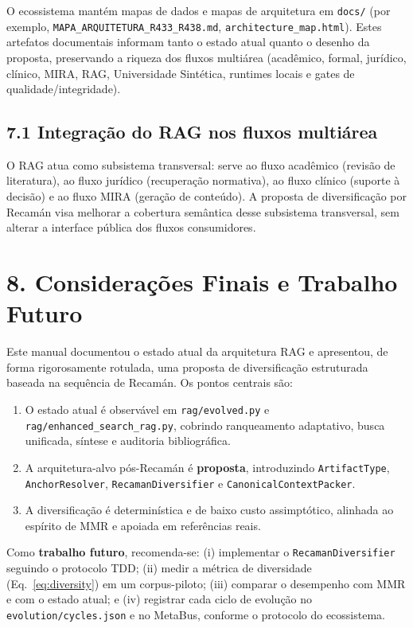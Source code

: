 \documentclass[
	article,
	11pt,
	oneside,
	a4paper,
	english,
	brazil,
	sumario=tradicional
	]{abntex2}
\begin{document}
O ecossistema mantém mapas de dados e mapas de arquitetura em
\texttt{docs/} (por exemplo, \texttt{MAPA\_ARQUITETURA\_R433\_R438.md},
\texttt{architecture\_map.html}). Estes artefatos documentais informam tanto o
estado atual quanto o desenho da proposta, preservando a riqueza dos fluxos
multiárea (acadêmico, formal, jurídico, clínico, MIRA, RAG, Universidade
Sintética, runtimes locais e gates de qualidade/integridade).

\subsection*{7.1 Integração do RAG nos fluxos multiárea}

O RAG atua como subsistema transversal: serve ao fluxo acadêmico (revisão de
literatura), ao fluxo jurídico (recuperação normativa), ao fluxo clínico
(suporte à decisão) e ao fluxo MIRA (geração de conteúdo). A proposta de
diversificação por Recamán visa melhorar a cobertura semântica desse subsistema
transversal, sem alterar a interface pública dos fluxos consumidores.

\section*{8. Considerações Finais e Trabalho Futuro}

Este manual documentou o estado atual da arquitetura RAG e apresentou, de forma
rigorosamente rotulada, uma proposta de diversificação estruturada baseada na
sequência de Recamán. Os pontos centrais são:

\begin{enumerate}[label=\arabic*.]
  \item O estado atual é observável em \texttt{rag/evolved.py} e
        \texttt{rag/enhanced\_search\_rag.py}, cobrindo ranqueamento adaptativo,
        busca unificada, síntese e auditoria bibliográfica.
  \item A arquitetura-alvo pós-Recamán é \textbf{proposta}, introduzindo
        \texttt{ArtifactType}, \texttt{AnchorResolver},
        \texttt{RecamanDiversifier} e \texttt{CanonicalContextPacker}.
  \item A diversificação é determinística e de baixo custo assimptótico,
        alinhada ao espírito de MMR e apoiada em referências reais.
\end{enumerate}

Como \textbf{trabalho futuro}, recomenda-se: (i) implementar o
\texttt{RecamanDiversifier} seguindo o protocolo TDD; (ii) medir a métrica de
diversidade (Eq.~\ref{eq:diversity}) em um corpus-piloto; (iii) comparar o
desempenho com MMR e com o estado atual; e (iv) registrar cada ciclo de evolução
no \texttt{evolution/cycles.json} e no MetaBus, conforme o protocolo do
ecossistema.

\clearpage


\end{document}
